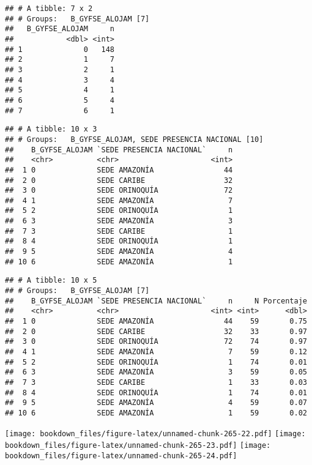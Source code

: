 \documentclass[]{article}
\theoremstyle{definition}
\theoremstyle{definition}
\theoremstyle{definition}
\theoremstyle{remark}
\begin{document}
\begin{verbatim}
## # A tibble: 7 x 2
## # Groups:   B_GYFSE_ALOJAM [7]
##   B_GYFSE_ALOJAM     n
##            <dbl> <int>
## 1              0   148
## 2              1     7
## 3              2     1
## 4              3     4
## 5              4     1
## 6              5     4
## 7              6     1
\end{verbatim}

\begin{verbatim}
## # A tibble: 10 x 3
## # Groups:   B_GYFSE_ALOJAM, SEDE PRESENCIA NACIONAL [10]
##    B_GYFSE_ALOJAM `SEDE PRESENCIA NACIONAL`     n
##    <chr>          <chr>                     <int>
##  1 0              SEDE AMAZONÍA                44
##  2 0              SEDE CARIBE                  32
##  3 0              SEDE ORINOQUÍA               72
##  4 1              SEDE AMAZONÍA                 7
##  5 2              SEDE ORINOQUÍA                1
##  6 3              SEDE AMAZONÍA                 3
##  7 3              SEDE CARIBE                   1
##  8 4              SEDE ORINOQUÍA                1
##  9 5              SEDE AMAZONÍA                 4
## 10 6              SEDE AMAZONÍA                 1
\end{verbatim}

\begin{verbatim}
## # A tibble: 10 x 5
## # Groups:   B_GYFSE_ALOJAM [7]
##    B_GYFSE_ALOJAM `SEDE PRESENCIA NACIONAL`     n     N Porcentaje
##    <chr>          <chr>                     <int> <int>      <dbl>
##  1 0              SEDE AMAZONÍA                44    59       0.75
##  2 0              SEDE CARIBE                  32    33       0.97
##  3 0              SEDE ORINOQUÍA               72    74       0.97
##  4 1              SEDE AMAZONÍA                 7    59       0.12
##  5 2              SEDE ORINOQUÍA                1    74       0.01
##  6 3              SEDE AMAZONÍA                 3    59       0.05
##  7 3              SEDE CARIBE                   1    33       0.03
##  8 4              SEDE ORINOQUÍA                1    74       0.01
##  9 5              SEDE AMAZONÍA                 4    59       0.07
## 10 6              SEDE AMAZONÍA                 1    59       0.02
\end{verbatim}

\texttt{[image: bookdown\_files/figure-latex/unnamed-chunk-265-22.pdf]}
\texttt{[image: bookdown\_files/figure-latex/unnamed-chunk-265-23.pdf]}
\texttt{[image: bookdown\_files/figure-latex/unnamed-chunk-265-24.pdf]}
\end{document}
